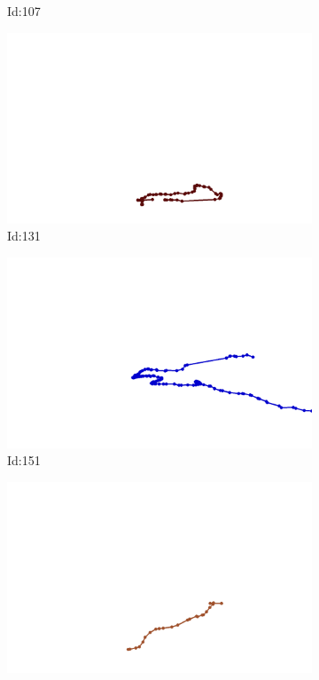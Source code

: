 \documentclass[12pt,twoside]{report}
\begin{document}
\begin{figure}
\begin{subfigure}[b]{0.20\textwidth}
\caption{Id:107}
\end{subfigure}
\begin{subfigure}[b]{0.20\textwidth}
\centering
\includegraphics[width=\textwidth]{../trajectories/131.png}
\caption{Id:131}
\end{subfigure}
\begin{subfigure}[b]{0.20\textwidth}
\centering
\includegraphics[width=\textwidth]{../trajectories/151.png}
\caption{Id:151}
\end{subfigure}
\begin{subfigure}[b]{0.20\textwidth}
\centering
\includegraphics[width=\textwidth]{../trajectories/156.png}

\end{subfigure}
\end{figure}
\end{document}
